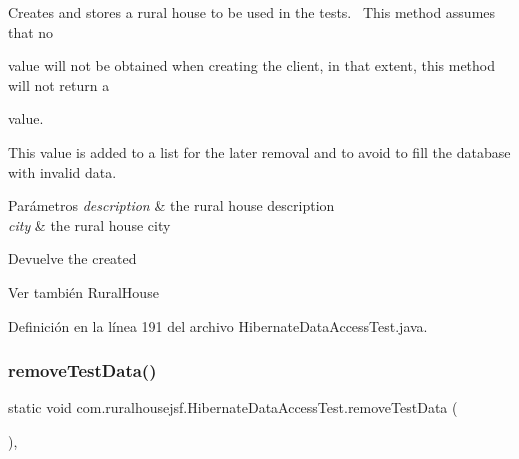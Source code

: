 Creates and stores a rural house to be used in the tests.~\newline
 This method assumes that no
\begin{DoxyCode}{0}
\DoxyCodeLine{\textcolor{keyword}{null} }
\end{DoxyCode}
 value will not be obtained when creating the client, in that extent, this method will not return a 
\begin{DoxyCode}{0}
\DoxyCodeLine{\textcolor{keyword}{null} }
\end{DoxyCode}
 value. 

This value is added to a list for the later removal and to avoid to fill the database with invalid data.


\begin{DoxyParams}{Parámetros}
{\em description} & the rural house description \\
\hline
{\em city} & the rural house city\\
\hline
\end{DoxyParams}
\begin{DoxyReturn}{Devuelve}
the created
\begin{DoxyCode}{0}
\end{DoxyCode}

\end{DoxyReturn}
\begin{DoxySeeAlso}{Ver también}
Rural\+House 
\end{DoxySeeAlso}


Definición en la línea 191 del archivo Hibernate\+Data\+Access\+Test.\+java.

\mbox{\label{classcom_1_1ruralhousejsf_1_1_hibernate_data_access_test_a71fef61bb66234d92d84ddd795de842a}} 
\subsubsection{\texorpdfstring{removeTestData()}{removeTestData()}}
{\footnotesize\ttfamily static void com.\+ruralhousejsf.\+Hibernate\+Data\+Access\+Test.\+remove\+Test\+Data (\begin{DoxyParamCaption}{ }\end{DoxyParamCaption})\hspace{0.3cm}{\ttfamily [static]}, {\ttfamily [private]}}

